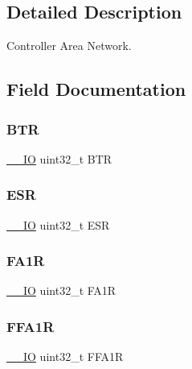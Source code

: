 \subsection{Detailed Description}
Controller Area Network. 

\subsection{Field Documentation}
\mbox{\label{struct_c_a_n___type_def_a5c0fcd3e7b4c59ab1dd68f6bd8f74e07}} 
\subsubsection{\texorpdfstring{BTR}{BTR}}
{\footnotesize\ttfamily \mbox{\hyperlink{core__sc300_8h_aec43007d9998a0a0e01faede4133d6be}{\+\_\+\+\_\+\+IO}} uint32\+\_\+t B\+TR}

\mbox{\label{struct_c_a_n___type_def_a2b39f943954e0e7d177b511d9074a0b7}} 
\subsubsection{\texorpdfstring{ESR}{ESR}}
{\footnotesize\ttfamily \mbox{\hyperlink{core__sc300_8h_aec43007d9998a0a0e01faede4133d6be}{\+\_\+\+\_\+\+IO}} uint32\+\_\+t E\+SR}

\mbox{\label{struct_c_a_n___type_def_aaf76271f4ab0b3deb3ceb6e2ac0d62d0}} 
\subsubsection{\texorpdfstring{FA1R}{FA1R}}
{\footnotesize\ttfamily \mbox{\hyperlink{core__sc300_8h_aec43007d9998a0a0e01faede4133d6be}{\+\_\+\+\_\+\+IO}} uint32\+\_\+t F\+A1R}

\mbox{\label{struct_c_a_n___type_def_af1405e594e39e5b34f9499f680157a25}} 
\subsubsection{\texorpdfstring{FFA1R}{FFA1R}}
{\footnotesize\ttfamily \mbox{\hyperlink{core__sc300_8h_aec43007d9998a0a0e01faede4133d6be}{\+\_\+\+\_\+\+IO}} uint32\+\_\+t F\+F\+A1R}

